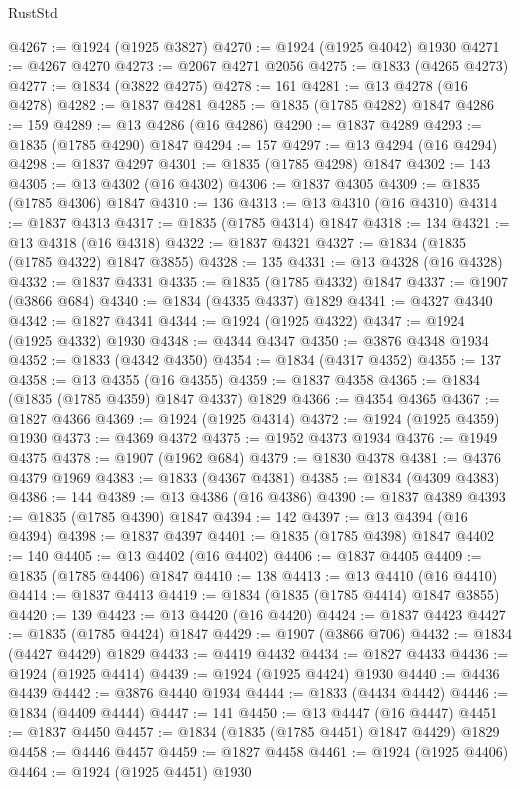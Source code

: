 \begin{lexlean}{RustStd}
\begin{coremodule}
@4267 := @1924 (@1925 @3827)
@4270 := @1924 (@1925 @4042) @1930
@4271 := @4267 @4270
@4273 := @2067 @4271 @2056
@4275 := @1833 (@4265 @4273)
@4277 := @1834 (@3822 @4275)
@4278 := 161
@4281 := @13 @4278 (@16 @4278)
@4282 := @1837 @4281
@4285 := @1835 (@1785 @4282) @1847
@4286 := 159
@4289 := @13 @4286 (@16 @4286)
@4290 := @1837 @4289
@4293 := @1835 (@1785 @4290) @1847
@4294 := 157
@4297 := @13 @4294 (@16 @4294)
@4298 := @1837 @4297
@4301 := @1835 (@1785 @4298) @1847
@4302 := 143
@4305 := @13 @4302 (@16 @4302)
@4306 := @1837 @4305
@4309 := @1835 (@1785 @4306) @1847
@4310 := 136
@4313 := @13 @4310 (@16 @4310)
@4314 := @1837 @4313
@4317 := @1835 (@1785 @4314) @1847
@4318 := 134
@4321 := @13 @4318 (@16 @4318)
@4322 := @1837 @4321
@4327 := @1834 (@1835 (@1785 @4322) @1847 @3855)
@4328 := 135
@4331 := @13 @4328 (@16 @4328)
@4332 := @1837 @4331
@4335 := @1835 (@1785 @4332) @1847
@4337 := @1907 (@3866 @684)
@4340 := @1834 (@4335 @4337) @1829
@4341 := @4327 @4340
@4342 := @1827 @4341
@4344 := @1924 (@1925 @4322)
@4347 := @1924 (@1925 @4332) @1930
@4348 := @4344 @4347
@4350 := @3876 @4348 @1934
@4352 := @1833 (@4342 @4350)
@4354 := @1834 (@4317 @4352)
@4355 := 137
@4358 := @13 @4355 (@16 @4355)
@4359 := @1837 @4358
@4365 := @1834 (@1835 (@1785 @4359) @1847 @4337) @1829
@4366 := @4354 @4365
@4367 := @1827 @4366
@4369 := @1924 (@1925 @4314)
@4372 := @1924 (@1925 @4359) @1930
@4373 := @4369 @4372
@4375 := @1952 @4373 @1934
@4376 := @1949 @4375
@4378 := @1907 (@1962 @684)
@4379 := @1830 @4378
@4381 := @4376 @4379 @1969
@4383 := @1833 (@4367 @4381)
@4385 := @1834 (@4309 @4383)
@4386 := 144
@4389 := @13 @4386 (@16 @4386)
@4390 := @1837 @4389
@4393 := @1835 (@1785 @4390) @1847
@4394 := 142
@4397 := @13 @4394 (@16 @4394)
@4398 := @1837 @4397
@4401 := @1835 (@1785 @4398) @1847
@4402 := 140
@4405 := @13 @4402 (@16 @4402)
@4406 := @1837 @4405
@4409 := @1835 (@1785 @4406) @1847
@4410 := 138
@4413 := @13 @4410 (@16 @4410)
@4414 := @1837 @4413
@4419 := @1834 (@1835 (@1785 @4414) @1847 @3855)
@4420 := 139
@4423 := @13 @4420 (@16 @4420)
@4424 := @1837 @4423
@4427 := @1835 (@1785 @4424) @1847
@4429 := @1907 (@3866 @706)
@4432 := @1834 (@4427 @4429) @1829
@4433 := @4419 @4432
@4434 := @1827 @4433
@4436 := @1924 (@1925 @4414)
@4439 := @1924 (@1925 @4424) @1930
@4440 := @4436 @4439
@4442 := @3876 @4440 @1934
@4444 := @1833 (@4434 @4442)
@4446 := @1834 (@4409 @4444)
@4447 := 141
@4450 := @13 @4447 (@16 @4447)
@4451 := @1837 @4450
@4457 := @1834 (@1835 (@1785 @4451) @1847 @4429) @1829
@4458 := @4446 @4457
@4459 := @1827 @4458
@4461 := @1924 (@1925 @4406)
@4464 := @1924 (@1925 @4451) @1930

\end{coremodule}
\end{lexlean}
